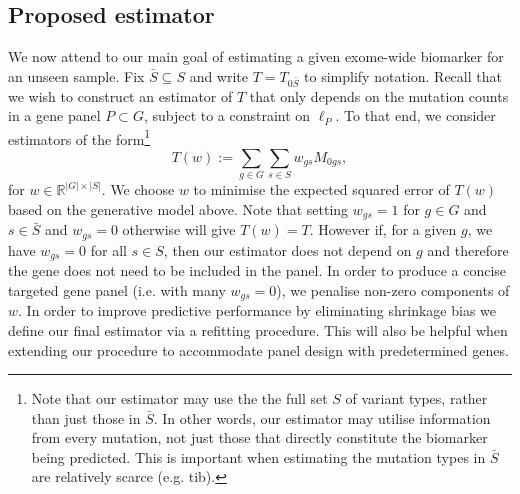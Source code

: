 \documentclass[12pt]{article}
\begin{document}
\subsection{Proposed estimator \label{sec:linearestimator}}
We now attend to our main goal of estimating a given exome-wide biomarker for an unseen sample. Fix $\bar{S} \subseteq S$ and write $T = T_{0\bar{S}}$ to simplify notation. Recall that we wish to construct an estimator of $T$ that only depends on the mutation counts in a gene panel $P \subset G$, subject to a constraint on $\ell_P$. To that end, we consider estimators of the form\footnote{Note that our estimator may use the the full set $S$ of variant types, rather than just those in $\bar{S}$. In other words, our estimator may utilise information from every mutation, not just those that directly constitute the biomarker being predicted. This is important when estimating the mutation types in $\bar{S}$ are relatively scarce (e.g. \acrlong{tib}).}
\[
T(w) := \sum_{g \in G} \sum_{s \in S} w_{gs}M_{0gs},
\]
for $w \in \mathbb{R}^{|G|\times |S|}$. We choose $w$ to minimise the expected squared error of $T(w)$ based on the generative model above. Note that setting $w_{gs}= 1$ for $g \in G$ and $s \in \bar{S}$ and $w_{gs} = 0$ otherwise will give $T(w) = T$. 
However if, for a given $g$, we have $w_{gs} = 0$ for all $s \in S$, then our estimator does not depend on $g$ and therefore the gene does not need to be included in the panel. In order to produce a concise targeted gene panel (i.e. with many $w_{gs} = 0$), we penalise non-zero components of $w$. In order to improve predictive performance by eliminating shrinkage bias we define our final estimator via a refitting procedure. This will also be helpful when extending our procedure to accommodate panel design with predetermined genes.
\end{document}
